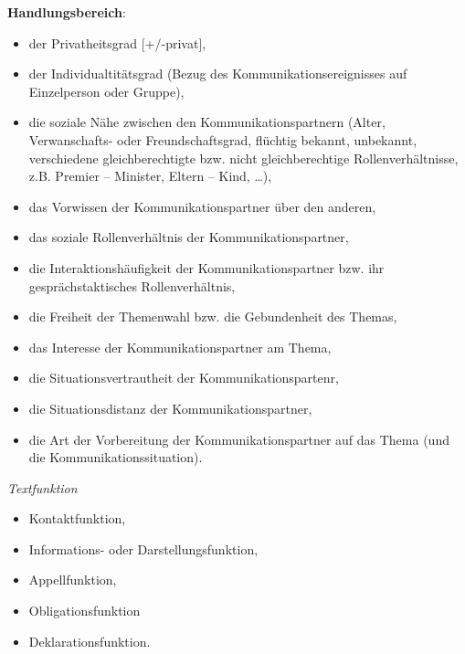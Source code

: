 \documentclass[
  letterpaper,
]{scrbook}
\providecommand{\tightlist}{%
  \setlength{\itemsep}{0pt}\setlength{\parskip}{0pt}}\usepackage{longtable,booktabs,array}
\begin{document}
\textbf{Handlungsbereich}:

\begin{itemize}
\tightlist
\item
  der Privatheitsgrad {[}+/-privat{]},\\
\item
  der Individualtitätsgrad (Bezug des Kommunikationsereignisses auf
  Einzelperson oder Gruppe),\\
\item
  die soziale Nähe zwischen den Kommunikationspartnern (Alter,
  Verwanschafts- oder Freundschaftsgrad, flüchtig bekannt, unbekannt,
  verschiedene gleichberechtigte bzw. nicht gleichberechtige
  Rollenverhältnisse, z.B. Premier -- Minister, Eltern -- Kind,
  \ldots),\\
\item
  das Vorwissen der Kommunikationspartner über den anderen,\\
\item
  das soziale Rollenverhältnis der Kommunikationspartner,\\
\item
  die Interaktionshäufigkeit der Kommunikationspartner bzw. ihr
  gesprächstaktisches Rollenverhältnis,\\
\item
  die Freiheit der Themenwahl bzw. die Gebundenheit des Themas,\\
\item
  das Interesse der Kommunikationspartner am Thema,\\
\item
  die Situationsvertrautheit der Kommunikationspartenr,\\
\item
  die Situationsdistanz der Kommunikationspartner,\\
\item
  die Art der Vorbereitung der Kommunikationspartner auf das Thema (und
  die Kommunikationssituation).\\
\end{itemize}

\emph{Textfunktion}

\begin{itemize}
\tightlist
\item
  Kontaktfunktion,\\
\item
  Informations- oder Darstellungsfunktion,\\
\item
  Appellfunktion,\\
\item
  Obligationsfunktion\\
\item
  Deklarationsfunktion.\\
\end{itemize}
\end{document}
